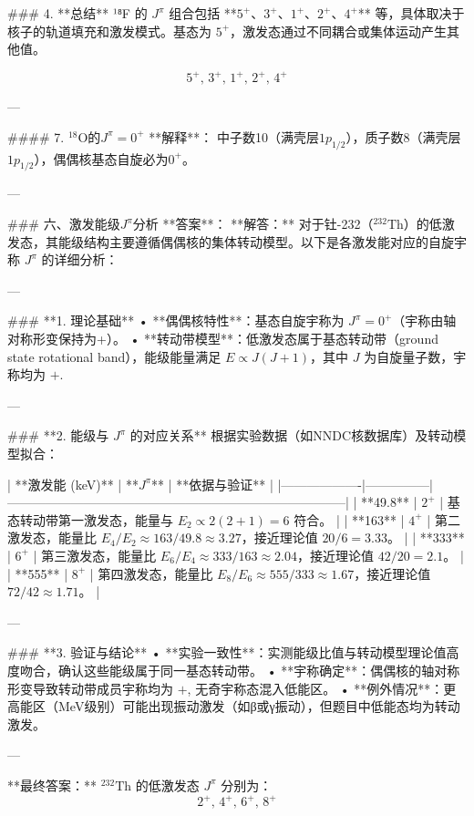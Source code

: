 \documentclass{article}
\begin{document}
### 4. **总结**
¹⁸F 的 \( J^\pi \) 组合包括 **\( 5^+ \)、\( 3^+ \)、\( 1^+ \)、\( 2^+ \)、\( 4^+ \)** 等，具体取决于核子的轨道填充和激发模式。基态为 \( 5^+ \)，激发态通过不同耦合或集体运动产生其他值。

\[
\boxed{5^+,\, 3^+,\, 1^+,\, 2^+,\, 4^+}
\]

---

#### 7. \(^{18}\text{O}\)的\(J^\pi = 0^+\)  
**解释**：  
中子数10（满壳层\(1p_{1/2}\)），质子数8（满壳层\(1p_{1/2}\)），偶偶核基态自旋必为\(0^+\)。

---

### 六、激发能级\(J^\pi\)分析  
**答案**：  
**解答：**  
对于钍-232（\(^{232}\text{Th}\)）的低激发态，其能级结构主要遵循偶偶核的集体转动模型。以下是各激发能对应的自旋宇称 \(J^\pi\) 的详细分析：

---

### **1. 理论基础**
• **偶偶核特性**：基态自旋宇称为 \(J^\pi = 0^+\)（宇称由轴对称形变保持为+）。  
• **转动带模型**：低激发态属于基态转动带（ground state rotational band），能级能量满足 \(E \propto J(J+1)\)，其中 \(J\) 为自旋量子数，宇称均为 \(+\).

---

### **2. 能级与 \(J^\pi\) 的对应关系**
根据实验数据（如NNDC核数据库）及转动模型拟合：

| **激发能 (keV)** | **\(J^\pi\)** | **依据与验证**                                                                 |
|-------------------|---------------|--------------------------------------------------------------------------------|
| **49.8**          | \(2^+\)       | 基态转动带第一激发态，能量与 \(E_2 \propto 2(2+1) = 6\) 符合。                |
| **163**           | \(4^+\)       | 第二激发态，能量比 \(E_4/E_2 \approx 163/49.8 \approx 3.27\)，接近理论值 \(20/6 = 3.33\)。 |
| **333**           | \(6^+\)       | 第三激发态，能量比 \(E_6/E_4 \approx 333/163 \approx 2.04\)，接近理论值 \(42/20 = 2.1\)。 |
| **555**           | \(8^+\)       | 第四激发态，能量比 \(E_8/E_6 \approx 555/333 \approx 1.67\)，接近理论值 \(72/42 \approx 1.71\)。 |

---

### **3. 验证与结论**
• **实验一致性**：实测能级比值与转动模型理论值高度吻合，确认这些能级属于同一基态转动带。  
• **宇称确定**：偶偶核的轴对称形变导致转动带成员宇称均为 \(+\), 无奇宇称态混入低能区。  
• **例外情况**：更高能区（MeV级别）可能出现振动激发（如β或γ振动），但题目中低能态均为转动激发。

---

**最终答案：**  
\(^{232}\text{Th}\) 的低激发态 \(J^\pi\) 分别为：  
\[
\boxed{2^+,\, 4^+,\, 6^+,\, 8^+}
\]
\end{document}
